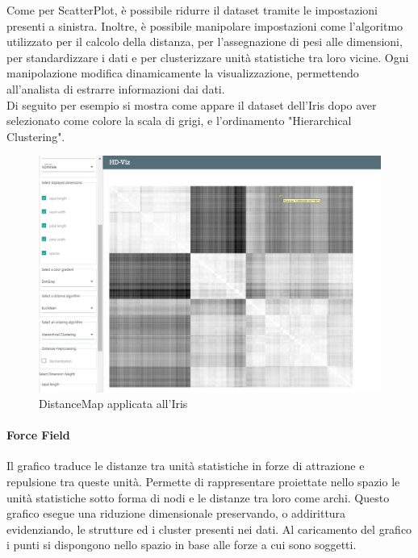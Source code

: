 \documentclass[../manuale_utente.tex]{subfiles}
\begin{document}
Come per ScatterPlot, è possibile ridurre il dataset tramite le impostazioni presenti a sinistra.
Inoltre, è possibile manipolare impostazioni come l'algoritmo utilizzato per il calcolo della distanza, per l'assegnazione di pesi alle dimensioni, per standardizzare i dati e per clusterizzare unità statistiche tra loro vicine. Ogni manipolazione modifica dinamicamente la visualizzazione, permettendo all'analista di estrarre informazioni dai dati.\\
Di seguito per esempio si mostra come appare il dataset dell'Iris dopo aver selezionato come colore la scala di grigi, e l'ordinamento "Hierarchical Clustering".


\begin{figure}[H]
	\centering
	\includegraphics[width=18cm]{src/img/dm/iris_clustering_euclideo_dm.jpg}
	\caption{DistanceMap applicata all'Iris}
\end{figure}


\paragraph{Force Field}
    \label{par:vis_force_field}
Il grafico  traduce le distanze tra unità statistiche in forze di attrazione e repulsione tra queste unità. Permette di rappresentare proiettate nello spazio le unità statistiche sotto forma di nodi e le distanze tra loro come archi. 
Questo grafico esegue una riduzione dimensionale preservando, o addirittura evidenziando, le strutture ed i cluster presenti nei dati.  Al caricamento del grafico i punti si dispongono nello spazio in base alle forze a cui sono soggetti. 
\end{document}
